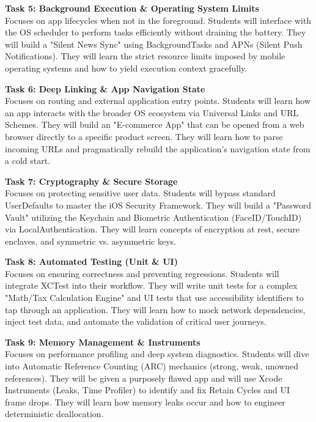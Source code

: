 \vspace{0.3cm}

\noindent\textbf{Task 5: Background Execution \& Operating System Limits} \\
Focuses on app lifecycles when not in the foreground. Students will interface with the OS scheduler to perform tasks efficiently without draining the battery. They will build a "Silent News Sync" using BackgroundTasks and APNs (Silent Push Notifications). They will learn the strict resource limits imposed by mobile operating systems and how to yield execution context gracefully.

\vspace{0.3cm}

\noindent\textbf{Task 6: Deep Linking \& App Navigation State} \\
Focuses on routing and external application entry points. Students will learn how an app interacts with the broader OS ecosystem via Universal Links and URL Schemes. They will build an "E-commerce App" that can be opened from a web browser directly to a specific product screen. They will learn how to parse incoming URLs and pragmatically rebuild the application's navigation state from a cold start.

\vspace{0.3cm}

\noindent\textbf{Task 7: Cryptography \& Secure Storage} \\
Focuses on protecting sensitive user data. Students will bypass standard UserDefaults to master the iOS Security Framework. They will build a "Password Vault" utilizing the Keychain and Biometric Authentication (FaceID/TouchID) via LocalAuthentication. They will learn concepts of encryption at rest, secure enclaves, and symmetric vs. asymmetric keys.

\vspace{0.3cm}

\noindent\textbf{Task 8: Automated Testing (Unit \& UI)} \\
Focuses on ensuring correctness and preventing regressions. Students will integrate XCTest into their workflow. They will write unit tests for a complex "Math/Tax Calculation Engine" and UI tests that use accessibility identifiers to tap through an application. They will learn how to mock network dependencies, inject test data, and automate the validation of critical user journeys.

\vspace{0.3cm}

\noindent\textbf{Task 9: Memory Management \& Instruments} \\
Focuses on performance profiling and deep system diagnostics. Students will dive into Automatic Reference Counting (ARC) mechanics (strong, weak, unowned references). They will be given a purposely flawed app and will use Xcode Instruments (Leaks, Time Profiler) to identify and fix Retain Cycles and UI frame drops. They will learn how memory leaks occur and how to engineer deterministic deallocation.

